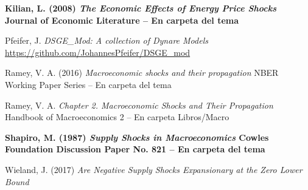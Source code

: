 \documentclass{nuevotema}
\begin{document}
\textbf{Kilian, L. (2008) \textit{The Economic Effects of Energy Price Shocks} Journal of Economic Literature -- En carpeta del tema}

Pfeifer, J. \textit{DSGE\_Mod: A collection of Dynare Models} \url{https://github.com/JohannesPfeifer/DSGE_mod}

Ramey, V. A. (2016) \textit{Macroeconomic shocks and their propagation}  NBER Working Paper Series -- En carpeta del tema

Ramey, V. A. \textit{Chapter 2. Macroeconomic Shocks and Their Propagation} Handbook of Macroeconomics 2 -- En carpeta Libros/Macro

\textbf{Shapiro, M. (1987) \textit{Supply Shocks in Macroeconomics} Cowles Foundation Discussion Paper No. 821 -- En carpeta del tema}

Wieland, J. (2017) \textit{Are Negative Supply Shocks Expansionary at the Zero Lower Bound} 
\end{document}

